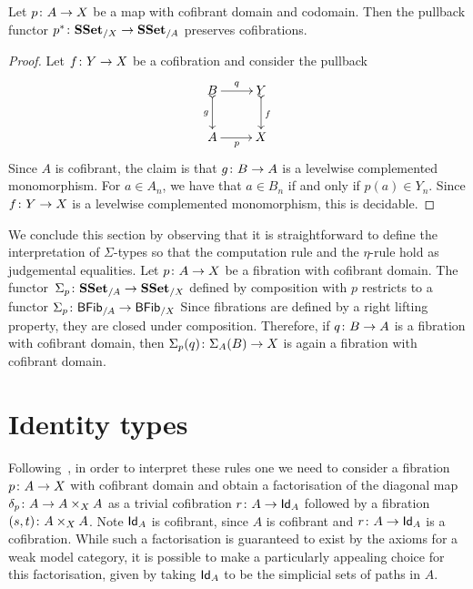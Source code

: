 \documentclass[reqno,10pt,a4paper,oneside,draft]{amsart}
\begin{document}
\begin{proposition} \label{thm:cof-pbk} Let $p \colon A \to X$  be a map with cofibrant domain and codomain.
Then the pullback functor $p^* \colon \mathbf{SSet}_{/X} \to \mathbf{SSet}_{/A}$ preserves cofibrations. 
\end{proposition}

\begin{proof} Let $f \colon Y \to X$ be a cofibration and consider the pullback
\[
\xymatrix{
B \ar[r]^-{q} \ar@{>->}[d]_-{g} &  Y \ar@{>->}[d]^{f} \\
A \ar[r]_{p} & X}
\]
Since $A$ is cofibrant, the claim is that $g \colon B \rightarrow A$ is a levelwise complemented monomorphism. For $a \in A_n$, we have that $a \in B_n$ if and only if $p(a) \in Y_n$. Since $f \colon Y \rightarrow X$ is a levelwise complemented monomorphism, this is decidable.
\end{proof} 


\begin{remark} 
We conclude this section by observing that it is straightforward to define the interpretation of
$\Sigma$-types so that the computation rule and the $\eta$-rule hold as judgemental equalities. 
Let  $p \colon A \to X$ be a fibration with cofibrant domain. The
functor~$\Sigma_p \colon \mathbf{SSet}_{/A} \to \mathbf{SSet}_{/X}$ defined by
composition with $p$ restricts to a functor
$\Sigma_p \colon \mathsf{BFib}_{/A}  \to \mathsf{BFib}_{/X}$
 Since fibrations are defined by a right lifting property, they are closed
under composition. Therefore, if $q \colon B \to A$ is a fibration with cofibrant domain, then
$\Sigma_p(q) \colon \Sigma_A(B) \to X$ is again a fibration with cofibrant domain.
\end{remark} 



\section{Identity types}

Following~\cite{awodey-warren:homotopy-idtype}, in order to interpret these rules one we need to consider
a fibration $p \colon A \to X$ with cofibrant domain  and obtain a factorisation of the diagonal map $\delta_p \colon A \to A \times_X A$ as a trivial cofibration $r \colon A \to  \mathsf{Id}_A$ followed by a fibration
$(s,t) \colon A \times_X A$. Note  $\mathsf{Id}_A$ is cofibrant, since $A$ is cofibrant and $r \colon A \to \mathsf{Id}_A$ is a cofibration. While such a factorisation is guaranteed to exist by the axioms for a weak model category,
it is possible to make a particularly appealing choice for this factorisation, given by taking $\mathsf{Id}_A$ to be
the simplicial sets of paths in $A$. 
\end{document}
